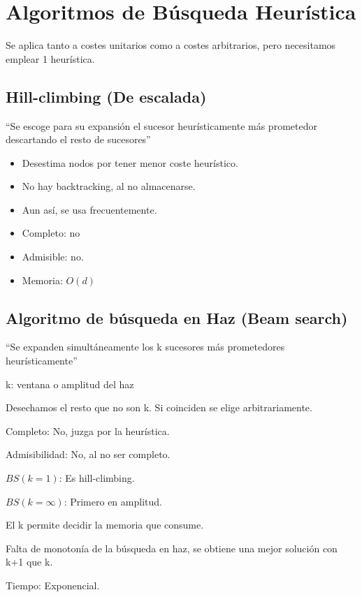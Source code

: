 \documentclass[12pt, twoside, openright]{report} %
\begin{document}
\section{Algoritmos de Búsqueda Heurística}

  Se aplica tanto a costes unitarios como a costes arbitrarios, pero
  necesitamos emplear 1 heurística.

\subsection{Hill-climbing (De escalada)}

  ``Se escoge para su expansión el sucesor heurísticamente más
  prometedor descartando el resto de sucesores''

  \begin{itemize}

  \item
    Desestima nodos por tener menor coste heurístico.
  \item
    No hay backtracking, al no almacenarse.
  \item
    Aun así, se usa frecuentemente.
  \item
    Completo: no
  \item
    Admisible: no.
  \item
    Memoria: \(O(d)\)
  \end{itemize}

\subsection{Algoritmo de búsqueda en Haz (Beam search)}

  ``Se expanden simultáneamente los k sucesores más prometedores
  heurísticamente''
 
    k: ventana o amplitud del haz

	Desechamos el resto que no son k. Si coinciden se elige
    arbitrariamente.

	Completo: No, juzga por la heurística.

	Admisibilidad: No, al no ser completo.

	\(BS(k=1)\): Es hill-climbing.

	\(BS(k= \infty)\): Primero en amplitud.

	El k permite decidir la memoria que consume.

	Falta de monotonía de la búsqueda en haz, se obtiene una mejor
    solución con k+1 que k.

	Tiempo: Exponencial.
\end{document}
